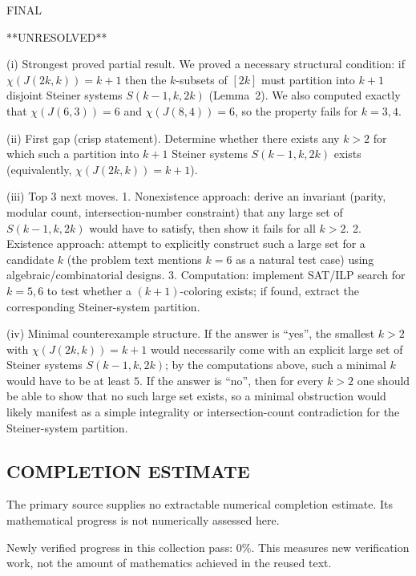 FINAL

**UNRESOLVED**

(i) Strongest proved partial result.
We proved a necessary structural condition: if $\chi(J(2k,k))=k+1$ then the $k$-subsets of $[2k]$ must partition into $k+1$ disjoint Steiner systems $S(k-1,k,2k)$ (Lemma~2).
We also computed exactly that $\chi(J(6,3))=6$ and $\chi(J(8,4))=6$, so the property fails for $k=3,4$.

(ii) First gap (crisp statement).
Determine whether there exists any $k>2$ for which such a partition into $k+1$ Steiner systems $S(k-1,k,2k)$ exists (equivalently, $\chi(J(2k,k))=k+1$).

(iii) Top 3 next moves.
1. Nonexistence approach: derive an invariant (parity, modular count, intersection-number constraint) that any large set of $S(k-1,k,2k)$ would have to satisfy, then show it fails for all $k>2$.
2. Existence approach: attempt to explicitly construct such a large set for a candidate $k$ (the problem text mentions $k=6$ as a natural test case) using algebraic/combinatorial designs.
3. Computation: implement SAT/ILP search for $k=5,6$ to test whether a $(k+1)$-coloring exists; if found, extract the corresponding Steiner-system partition.

(iv) Minimal counterexample structure.
If the answer is “yes”, the smallest $k>2$ with $\chi(J(2k,k))=k+1$ would necessarily come with an explicit large set of Steiner systems $S(k-1,k,2k)$; by the computations above, such a minimal $k$ would have to be at least $5$.
If the answer is “no”, then for every $k>2$ one should be able to show that no such large set exists, so a minimal obstruction would likely manifest as a simple integrality or intersection-count contradiction for the Steiner-system partition.



\subsection*{COMPLETION ESTIMATE}
The primary source supplies no extractable numerical completion estimate. Its mathematical progress is not numerically assessed here.

Newly verified progress in this collection pass: $0\%$. This measures new verification work, not the amount of mathematics achieved in the reused text.
